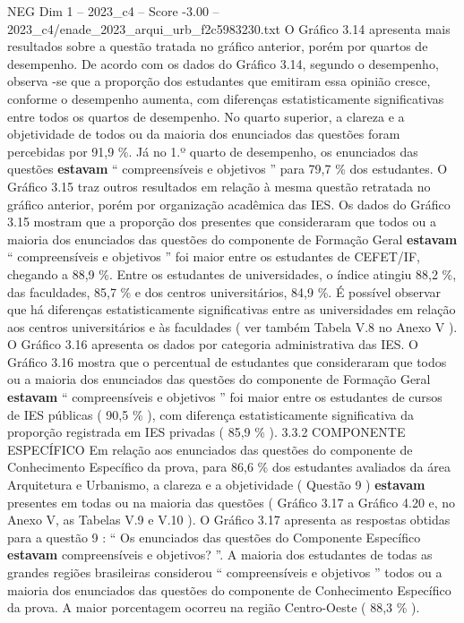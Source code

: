 \begin{textsample}{NEG Dim 1 – 2023\_c4 – Score -3.00 – 2023\_c4/enade\_2023\_arqui\_urb\_f2c5983230.txt}
O Gráfico 3.14 apresenta mais resultados sobre a questão tratada no gráfico anterior, porém por quartos de desempenho.
De acordo com os dados do Gráfico 3.14, segundo o desempenho, observa -se que a proporção dos estudantes que emitiram essa opinião cresce, conforme o desempenho aumenta, com diferenças estatisticamente significativas entre todos os quartos de desempenho.
No quarto superior, a clareza e a objetividade de todos ou da maioria dos enunciados das questões foram percebidas por 91,9 \%.
Já no 1.º quarto de desempenho, os enunciados das questões \textbf{estavam} “ compreensíveis e objetivos ” para 79,7 \% dos estudantes.
O Gráfico 3.15 traz outros resultados em relação à mesma questão retratada no gráfico anterior, porém por organização acadêmica das IES.
Os dados do Gráfico 3.15 mostram que a proporção dos presentes que consideraram que todos ou a maioria dos enunciados das questões do componente de Formação Geral \textbf{estavam} “ compreensíveis e objetivos ” foi maior entre os estudantes de CEFET/IF, chegando a 88,9 \%.
Entre os estudantes de universidades, o índice atingiu 88,2 \%, das faculdades, 85,7 \% e dos centros universitários, 84,9 \%.
É possível observar que há diferenças estatisticamente significativas entre as universidades em relação aos centros universitários e às faculdades ( ver também Tabela V.8 no Anexo V ).
O Gráfico 3.16 apresenta os dados por categoria administrativa das IES.
O Gráfico 3.16 mostra que o percentual de estudantes que consideraram que todos ou a maioria dos enunciados das questões do componente de Formação Geral \textbf{estavam} “ compreensíveis e objetivos ” foi maior entre os estudantes de cursos de IES públicas ( 90,5 \% ), com diferença estatisticamente significativa da proporção registrada em IES privadas ( 85,9 \% ). 3.3.2 COMPONENTE ESPECÍFICO Em relação aos enunciados das questões do componente de Conhecimento Específico da prova, para 86,6 \% dos estudantes avaliados da área Arquitetura e Urbanismo, a clareza e a objetividade ( Questão 9 ) \textbf{estavam} presentes em todas ou na maioria das questões ( Gráfico 3.17 a Gráfico 4.20 e, no Anexo V, as Tabelas V.9 e V.10 ).
O Gráfico 3.17 apresenta as respostas obtidas para a questão 9 : “ Os enunciados das questões do Componente Específico \textbf{estavam} compreensíveis e objetivos? ”.
A maioria dos estudantes de todas as grandes regiões brasileiras considerou “ compreensíveis e objetivos ” todos ou a maioria dos enunciados das questões do componente de Conhecimento Específico da prova.
A maior porcentagem ocorreu na região Centro-Oeste ( 88,3 \% ).

\end{textsample}
